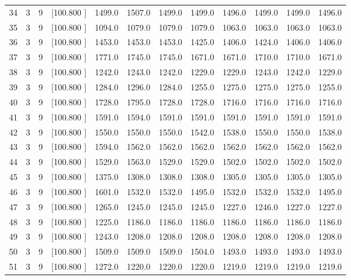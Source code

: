 \documentclass[12pt,a4paper]{article}
\begin{document}
\begin{center}
{\begin{tabular}{r r r r r r r r r r r r}
  34&  3&  9&[100.800   ]&  1499.0&  1507.0&  1499.0&  1499.0&  1496.0&  1499.0&  1499.0&  1496.0\\[-0.02in]
  35&  3&  9&[100.800   ]&  1094.0&  1079.0&  1079.0&  1079.0&  1063.0&  1063.0&  1063.0&  1063.0\\[-0.02in]
  36&  3&  9&[100.800   ]&  1453.0&  1453.0&  1453.0&  1425.0&  1406.0&  1424.0&  1406.0&  1406.0\\[-0.02in]
  37&  3&  9&[100.800   ]&  1771.0&  1745.0&  1745.0&  1671.0&  1671.0&  1710.0&  1710.0&  1671.0\\[-0.02in]
  38&  3&  9&[100.800   ]&  1242.0&  1243.0&  1242.0&  1229.0&  1229.0&  1243.0&  1242.0&  1229.0\\[-0.02in]
  39&  3&  9&[100.800   ]&  1284.0&  1296.0&  1284.0&  1255.0&  1275.0&  1275.0&  1275.0&  1255.0\\[-0.02in]
  40&  3&  9&[100.800   ]&  1728.0&  1795.0&  1728.0&  1728.0&  1716.0&  1716.0&  1716.0&  1716.0\\[-0.02in]
  41&  3&  9&[100.800   ]&  1591.0&  1594.0&  1591.0&  1591.0&  1591.0&  1591.0&  1591.0&  1591.0\\[-0.02in]
  42&  3&  9&[100.800   ]&  1550.0&  1550.0&  1550.0&  1542.0&  1538.0&  1550.0&  1550.0&  1538.0\\[-0.02in]
  43&  3&  9&[100.800   ]&  1594.0&  1562.0&  1562.0&  1562.0&  1562.0&  1562.0&  1562.0&  1562.0\\[-0.02in]
  44&  3&  9&[100.800   ]&  1529.0&  1563.0&  1529.0&  1529.0&  1502.0&  1502.0&  1502.0&  1502.0\\[-0.02in]
  45&  3&  9&[100.800   ]&  1375.0&  1308.0&  1308.0&  1308.0&  1305.0&  1305.0&  1305.0&  1305.0\\[-0.02in]
  46&  3&  9&[100.800   ]&  1601.0&  1532.0&  1532.0&  1495.0&  1532.0&  1532.0&  1532.0&  1495.0\\[-0.02in]
  47&  3&  9&[100.800   ]&  1265.0&  1245.0&  1245.0&  1245.0&  1227.0&  1246.0&  1227.0&  1227.0\\[-0.02in]
  48&  3&  9&[100.800   ]&  1225.0&  1186.0&  1186.0&  1186.0&  1186.0&  1186.0&  1186.0&  1186.0\\[-0.02in]
  49&  3&  9&[100.800   ]&  1243.0&  1208.0&  1208.0&  1208.0&  1208.0&  1208.0&  1208.0&  1208.0\\[-0.02in]
  50&  3&  9&[100.800   ]&  1509.0&  1509.0&  1509.0&  1504.0&  1493.0&  1493.0&  1493.0&  1493.0\\[-0.02in]
  51&  3&  9&[100.800   ]&  1272.0&  1220.0&  1220.0&  1220.0&  1219.0&  1219.0&  1219.0&  1219.0\\[-0.02in]

\end{tabular}}
\end{center}
\end{document}

